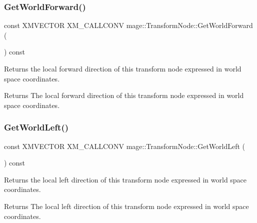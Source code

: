 \subsubsection{\texorpdfstring{Get\+World\+Forward()}{GetWorldForward()}}
{\footnotesize\ttfamily const X\+M\+V\+E\+C\+T\+OR X\+M\+\_\+\+C\+A\+L\+L\+C\+O\+NV mage\+::\+Transform\+Node\+::\+Get\+World\+Forward (\begin{DoxyParamCaption}{ }\end{DoxyParamCaption}) const\hspace{0.3cm}{\ttfamily [noexcept]}}

Returns the local forward direction of this transform node expressed in world space coordinates.

\begin{DoxyReturn}{Returns}
The local forward direction of this transform node expressed in world space coordinates. 
\end{DoxyReturn}
\hypertarget{classmage_1_1_transform_node_a9569d0014fbee2a3d1179b1acbb402f8}{}\label{classmage_1_1_transform_node_a9569d0014fbee2a3d1179b1acbb402f8} 
\subsubsection{\texorpdfstring{Get\+World\+Left()}{GetWorldLeft()}}
{\footnotesize\ttfamily const X\+M\+V\+E\+C\+T\+OR X\+M\+\_\+\+C\+A\+L\+L\+C\+O\+NV mage\+::\+Transform\+Node\+::\+Get\+World\+Left (\begin{DoxyParamCaption}{ }\end{DoxyParamCaption}) const\hspace{0.3cm}{\ttfamily [noexcept]}}

Returns the local left direction of this transform node expressed in world space coordinates.

\begin{DoxyReturn}{Returns}
The local left direction of this transform node expressed in world space coordinates. 
\end{DoxyReturn}
\hypertarget{classmage_1_1_transform_node_a8c9f0abc146e7b7664218df44057a626}{}\label{classmage_1_1_transform_node_a8c9f0abc146e7b7664218df44057a626} 
